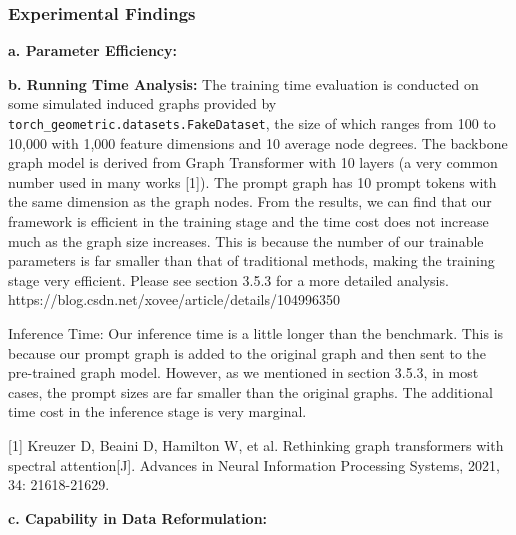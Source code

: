 \subsubsection{Experimental Findings}\label{subsec:exp}

\noindent \textbf{a. Parameter Efficiency:}



\vspace*{3\baselineskip} 

\noindent \textbf{b. Running Time Analysis:}
The training time evaluation is conducted on some simulated induced graphs provided by \verb|torch_geometric.datasets.FakeDataset|, the size of which ranges from 100 to 10,000 with 1,000 feature dimensions and 10 average node degrees. The backbone graph model is derived from Graph Transformer with 10 layers (a very common number used in many works [1]). The prompt graph has 10 prompt tokens with the same dimension as the graph nodes. From the results, we can find that our framework is efficient in the training stage and the time cost does not increase much as the graph size increases. This is because the number of our trainable parameters is far smaller than that of traditional methods, making the training stage very efficient. Please see section 3.5.3 for a more detailed analysis.
https://blog.csdn.net/xovee/article/details/104996350



Inference Time: Our inference time is a little longer than the benchmark. This is because our prompt graph is added to the original graph and then sent to the pre-trained graph model. However, as we mentioned in section 3.5.3, in most cases, the prompt sizes are far smaller than the original graphs. The additional time cost in the inference stage is very marginal.



[1] Kreuzer D, Beaini D, Hamilton W, et al. Rethinking graph transformers with spectral attention[J]. Advances in Neural Information Processing Systems, 2021, 34: 21618-21629.


\noindent \textbf{c. Capability in Data Reformulation:}



\vspace*{3\baselineskip} 
